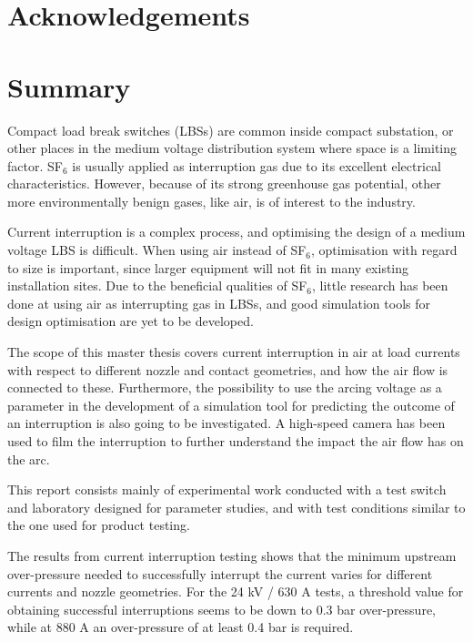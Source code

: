 \documentclass[10pt,b5paper,twoside]{article}
\begin{document}
\thispagestyle{empty}
\cleardoublepage
\section*{Acknowledgements}
\setcounter{page}{1}

\cleardoublepage
\section*{Summary}
Compact load break switches (LBSs) are common inside compact substation, or other places in the medium voltage distribution system where space is a limiting factor. SF$_6$ is usually applied as interruption gas due to its excellent electrical characteristics. However, because of its strong greenhouse gas potential, other more environmentally benign gases, like air, is of interest to the industry.

Current interruption is a complex process, and optimising the design of a medium voltage LBS is difficult. When using air instead of SF$_6$, optimisation with regard to size is important, since larger equipment will not fit in many existing installation sites. Due to the beneficial qualities of SF$_6$, little research has been done at using air as interrupting gas in LBSs, and good simulation tools for design optimisation are yet to be developed.

The scope of this master thesis covers current interruption in air at load currents with respect to different nozzle and contact geometries, and how the air flow is connected to these. Furthermore, the possibility to use the arcing voltage as a parameter in the development of a simulation tool for predicting the outcome of an interruption is also going to be investigated. A high-speed camera has been used to film the interruption to further understand the impact the air flow has on the arc.

This report consists mainly of experimental work conducted with a test switch and laboratory designed for parameter studies, and with test conditions similar to the one used for product testing.

The results from current interruption testing shows that the minimum upstream over-pressure needed to successfully interrupt the current varies for different currents and nozzle geometries. For the 24 kV / 630 A tests, a threshold value for obtaining successful interruptions seems to be down to 0.3 bar over-pressure, while at 880 A an over-pressure of at least 0.4 bar is required.
\end{document}
